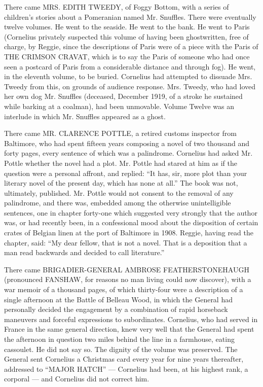 \documentclass[12pt,openright]{book}
\begin{document}
There came MRS. EDITH TWEEDY, of Foggy Bottom, with a series of children’s stories about a Pomeranian named Mr. Snuffles. There were eventually twelve volumes. He went to the seaside. He went to the bank. He went to Paris (Cornelius privately suspected this volume of having been ghostwritten, free of charge, by Reggie, since the descriptions of Paris were of a piece with the Paris of THE CRIMSON CRAVAT, which is to say the Paris of someone who had once seen a postcard of Paris from a considerable distance and through fog). He went, in the eleventh volume, to be buried. Cornelius had attempted to dissuade Mrs. Tweedy from this, on grounds of audience response. Mrs. Tweedy, who had loved her own dog Mr. Snuffles (deceased, December 1919, of a stroke he sustained while barking at a coalman), had been unmovable. Volume Twelve was an interlude in which Mr. Snuffles appeared as a ghost.

There came MR. CLARENCE POTTLE, a retired customs inspector from Baltimore, who had spent fifteen years composing a novel of two thousand and forty pages, every sentence of which was a palindrome. Cornelius had asked Mr. Pottle whether the novel had a plot. Mr. Pottle had stared at him as if the question were a personal affront, and replied: “It has, sir, more plot than your literary novel of the present day, which has none at all.” The book was not, ultimately, published. Mr. Pottle would not consent to the removal of any palindrome, and there was, embedded among the otherwise unintelligible sentences, one in chapter forty-one which suggested very strongly that the author was, or had recently been, in a confessional mood about the disposition of certain crates of Belgian linen at the port of Baltimore in 1908. Reggie, having read the chapter, said: “My dear fellow, that is not a novel. That is a deposition that a man read backwards and decided to call literature.”

There came BRIGADIER-GENERAL AMBROSE FEATHERSTONEHAUGH (pronounced FANSHAW, for reasons no man living could now discover), with a war memoir of a thousand pages, of which thirty-four were a description of a single afternoon at the Battle of Belleau Wood, in which the General had personally decided the engagement by a combination of rapid horseback maneuvers and forceful expressions to subordinates. Cornelius, who had served in France in the same general direction, knew very well that the General had spent the afternoon in question two miles behind the line in a farmhouse, eating cassoulet. He did not say so. The dignity of the volume was preserved. The General sent Cornelius a Christmas card every year for nine years thereafter, addressed to “MAJOR HATCH” — Cornelius had been, at his highest rank, a corporal — and Cornelius did not correct him.
\end{document}
